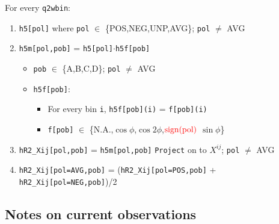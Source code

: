 \documentclass{article}
\newcommand{\code}[1]{\texttt{#1}}
\numberwithin{equation}{subsection}
\begin{document}
For every \code{q2wbin}:
\begin{enumerate}
	\item \code{h5[pol]} where \code{pol} $\in$ \{POS,NEG,UNP,AVG\}; \code{pol} $\neq$ AVG
	\item \code{h5m[pol,pob]} = \code{h5[pol]}$\cdot$\code{h5f[pob]} 
		\begin{itemize}
		\item \code{pob} $\in$ \{A,B,C,D\}; \code{pol} $\neq$ AVG
		\item \code{h5f[pob]}:
			\begin{itemize}
			\item For every bin \code{i}, \code{h5f[pob](i)} = \code{f[pob](i)}
			\item \code{f[pob]} $\in$ \{N.A.,$\cos\phi$,$\cos 2\phi$,$\color{red}{\text{sign(pol)}}$ $\sin\phi$\}
			\end{itemize}
		\end{itemize}
	\item \code{hR2\_Xij[pol,pob]} = \code{h5m[pol,pob]} \code{Project} on to $X^{ij}$; \code{pol} $\neq$ AVG
	\item \code{hR2\_Xij[pol=AVG,pob]} = (\code{hR2\_Xij[pol=POS,pob]} + \code{hR2\_Xij[pol=NEG,pob]})/2
\end{enumerate}

\subsection{Notes on current observations}





\end{document}
